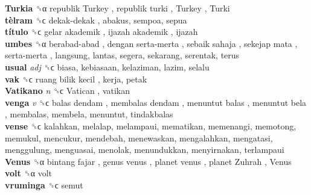 \textbf{Turkia} ␝α   republik Turkey ,  republik turki ,  Turkey ,  Turki   \\
\textbf{tèlram} ␝ϲ   dekak-dekak , abakus, sempoa, sepua  \\
\textbf{título} ␝ϲ   gelar akademik ,  ijazah akademik , ijazah  \\
\textbf{umbes} ␝α   berabad-abad ,  dengan serta-merta ,  sebaik sahaja ,  sekejap mata ,  serta-merta , langsung, lantas, segera, sekarang, serentak, terus  \\
\textbf{usual} \emph{adj}  ␝ϲ  biasa, kebiasaan, kelaziman, lazim, selalu  \\
\textbf{vak} ␝ϲ   ruang bilik kecil , kerja, petak  \\
\textbf{Vatikano} \emph{n}  ␝ϲ   Vatican , vatikan  \\
\textbf{venga} \emph{v}  ␝ϲ   balas dendam ,  membalas dendam ,  menuntut balas ,  menuntut bela , membalas, membela, menuntut, tindakbalas  \\
\textbf{vense} ␝ϲ  kalahkan, melalap, melampaui, mematikan, memenangi, memotong, memukul, mencukur, mendebah, menewaskan, mengalahkan, mengatasi, menggulung, menguasai, menolak, menundukkan, menyirnakan, terlampaui  \\
\textbf{Venus} ␝α   bintang fajar ,  genus venus ,  planet venus ,  planet Zuhrah ,  Venus   \\
\textbf{volt} ␝α  volt  \\
\textbf{vruminga} ␝ϲ  semut  \\

